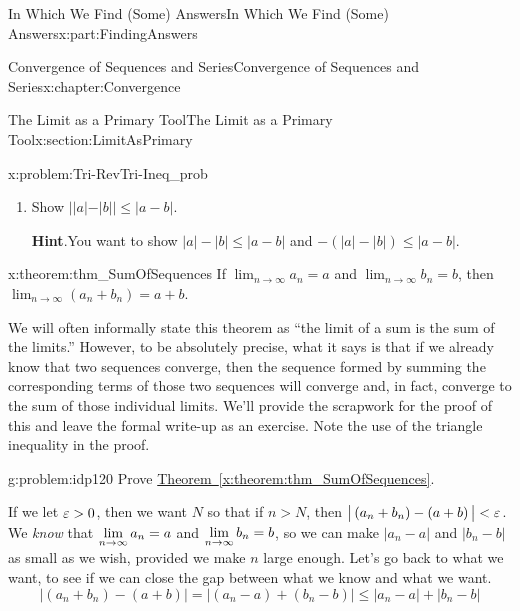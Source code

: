 \begin{partptx}{In Which We Find (Some) Answers}{}{In Which We Find (Some) Answers}{}{}{x:part:FindingAnswers}
\begin{chapterptx}{Convergence of Sequences and Series}{}{Convergence of Sequences and Series}{}{}{x:chapter:Convergence}
\begin{sectionptx}{The Limit as a Primary Tool}{}{The Limit as a Primary Tool}{}{}{x:section:LimitAsPrimary}
\begin{problem}{}{x:problem:Tri-RevTri-Ineq_prob}
\begin{enumerate}[font=\bfseries,label=(\alph*),ref=\alph*]
					\noindent\textbf{\blocktitlefont Hint}.\hypertarget{g:hint:idp118}{}\quad{}For the Reverse Triangle Inequality, consider \(|a|=|a-b+b|\).%
					\item{}Show \(||a|-|b||\leq|a-b|\).%
					\par\smallskip%
					\noindent\textbf{\blocktitlefont Hint}.\hypertarget{g:hint:idp119}{}\quad{}You want to show \(|a|-|b|\leq|a-b|\) and \(-(|a|-|b|)\leq|a-b|\).%
				\end{enumerate}
			\end{problem}
			\begin{theorem}{}{}{x:theorem:thm_SumOfSequences}%
				 If \(\displaystyle\lim_{n\rightarrow\infty}a_n=a\) and \(\displaystyle\lim_{n\rightarrow\infty}b_n=b\), then \(\displaystyle\lim_{n\rightarrow\infty}\left(a_n+b_n\right)=a+b\).%
			\end{theorem}
			We will often informally state this theorem as ``the limit of a sum is the sum of the limits.'' However, to be absolutely precise, what it says is that if we already know that two sequences converge, then the sequence formed by summing the corresponding terms of those two sequences will converge and, in fact, converge to the sum of those individual limits. We'll provide the scrapwork for the proof of this and leave the formal write-up as an exercise. Note the use of the triangle inequality in the proof.%
			\par
			\begin{problem}{}{g:problem:idp120}%
				 Prove \hyperref[x:theorem:thm_SumOfSequences]{Theorem~{\xreffont\ref{x:theorem:thm_SumOfSequences}}}.%
				\par
				\par
				If we let \(\varepsilon>0\), then we want \(N\) so that if \(n>N\), then \(\big|\left(a_n+b_n\right)-\left(a+b\right)\big|< \varepsilon\). We \emph{know} that \({\displaystyle\lim_{n\rightarrow \infty}a_n}=a\) and \({\displaystyle\lim_{n\rightarrow \infty}b_n}=b\), so we can make \(\big|a_n-a\big|\) and  \(\big|b_n-b\big|\) as small as we wish, provided we make \(n\) large enough. Let's go back to what we want, to see if we can close the gap between what we know and what we want.%
				\begin{equation*}
					\left|\left(a_n+b_n\right)-\left(a+b\right)\right|=\left|\left(a_n-a\right)+\left(b_n-b\right)\right|\leq\left|a_n-a\right|+\left|b_n-b\right|
				\end{equation*}

\end{problem}
\end{sectionptx}
\end{chapterptx}
\end{partptx}
